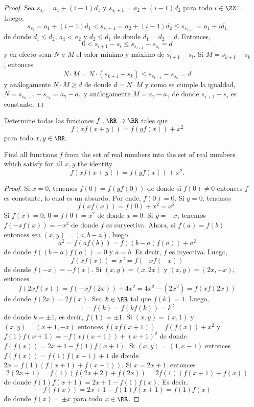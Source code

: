 \begin{proof}
  Sea $s_{s_i}=a_1+(i-1)d_1$ y $s_{s_i+1}=a_2+(i-1)d_2$ para todo $i\in\ZZ^+$.
  Luego,
  \[s_{s_i}=a_1+(i-1)d_1<s_{s_i+1}=a_2+(i-1)d_2\le s_{s_{i+1}}=a_1+id_1\]
  de donde $d_1\le d_2$, $a_1<a_2$ y $d_2\le d_1$ de donde $d_1=d_2=d$.
  Entonces,
  \[0<s_{i+1}-s_i\le s_{s_{i+1}}-s_{s_i}=d\]
  y en efecto sean $N$ y $M$ el valor mínimo y máximo de $s_{i+1}-s_i$. Si
  $M=s_{k+1}-s_k$, entonces
  \[N\cdot M=N\cdot(s_{k+1}-s_k)\le s_{s_{k+1}}-s_{s_k}=d\]
  y análogamente $N\cdot M\ge d$ de donde $d=N\cdot M$ y como se cumple la
  igualdad, $N=s_{s_k+1}-s_{s_k}=a_2-a_1$ y análogamente $M=a_2-a_1$ de donde
  $s_{i+1}-s_i$ es constante.
\end{proof}

\begin{probMG}[ISL 2009/A7]
  Determine todas las funciones $f:\RR\to\RR$ tales que
  \[f(xf(x+y))=f(yf(x))+x^2\]
  para todo $x,y\in\RR$.
  \begin{hint}
    Find all functions $f$ from the set of real numbers into the set of real
    numbers which satisfy for all $x,y$ the identity
    \[f(xf(x+y))=f(yf(x))+x^2.\]
  \end{hint}
\end{probMG}

\begin{proof}
  Si $x=0$, tenemos $f(0)=f(yf(0))$ de donde si $f(0)\ne 0$ entonces $f$ es
  constante, lo cual es un absurdo. Por ende, $f(0)=0$. Si $y=0$, tenemos
  \[f(xf(x))=f(0)+x^2=x^2.\]
  Si $f(x)=0$, $0=f(0)=x^2$ de donde $x=0$. Si $y=-x$, tenemos $f(-xf(x))=-x^2$
  de donde $f$ es suryectiva. Ahora, si $f(a)=f(b)$ entonces sea
  $(x,y)=(a,b-a)$, luego
  \[a^2=f(af(b))=f((b-a)f(a))+a^2\]
  de donde $f((b-a)f(a))=0$ y $a=b$. Es decir, $f$ es inyectiva. Luego,
  \[f(xf(x))=x^2=f(-xf(-x))\]
  de donde $f(-x)=-f(x)$. Si $(x,y)=(x,2x)$ y $(x,y)=(2x,-x)$, entonces
  \[f(2xf(x))=f(-xf(2x))+4x^2=4x^2-(2x^2)=f(xf(2x))\]
  de donde $f(2x)=2f(x)$. Sea $k\in\RR$ tal que $f(k)=1$. Luego,
  \[1=f(k)=f(kf(k))=k^2\]
  de donde $k=\pm 1$, es decir, $f(1)=\pm 1$. Si $(x,y)=(x,1)$ y
  $(x,y)=(x+1,-x)$ entonces $f(xf(x+1))=f(f(x))+x^2$ y
  $f(1)f(x+1)=-f(xf(x+1))+(x+1)^2$ de donde $f(f(x))=2x+1-f(1)f(x+1)$. Si
  $(x,y)=(1,x-1)$ entonces $f(f(x))=f(1)f(x-1)+1$ de donde
  $2x=f(1)(f(x+1)+f(x-1))$. Si $x=2x+1$, entonces
  \[2(2x+1)=f(1)(f(2x+2)+f(2x))=2f(1)(f(x+1)+f(x))\]
  de donde $f(1)f(x+1)=2x+1-f(1)f(x)$. Es decir,
  \[f(f(x))=2x+1-f(1)f(x+1)=f(1)f(x)\]
  de donde $f(x)=\pm x$ para todo $x\in\RR$.
\end{proof}


